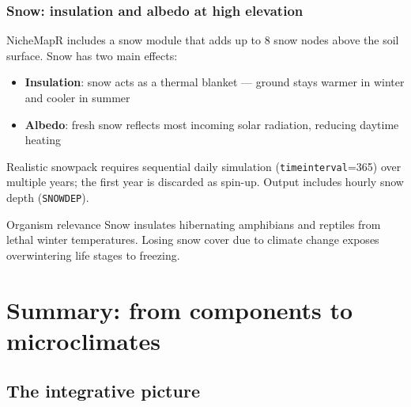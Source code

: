 \documentclass{beamer}
\begin{document}
\begin{frame}
  \frametitle{Snow: insulation and albedo at high elevation}

  NicheMapR includes a snow module that adds up to 8 snow nodes above the soil surface. Snow has two main effects:

  \vspace{0.2cm}

  \begin{itemize}
    \item \textbf{Insulation}: snow acts as a thermal blanket --- ground stays warmer in winter and cooler in summer
    \item \textbf{Albedo}: fresh snow reflects most incoming solar radiation, reducing daytime heating
  \end{itemize}

  \vspace{0.2cm}

  Realistic snowpack requires sequential daily simulation (\texttt{timeinterval}=365) over multiple years; the first year is discarded as spin-up. Output includes hourly snow depth (\texttt{SNOWDEP}).

  \vspace{0.2cm}

  \begin{block}{Organism relevance}
    Snow insulates hibernating amphibians and reptiles from lethal winter temperatures. Losing snow cover due to climate change exposes overwintering life stages to freezing.
  \end{block}
\end{frame}

\section{Summary: from components to microclimates}
\subsection{The integrative picture}
\end{document}
